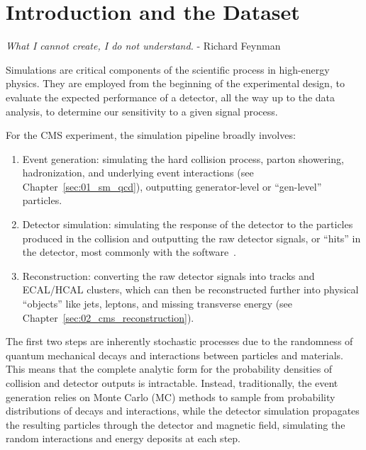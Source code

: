 
\chapter{Introduction and the \jetnet Dataset}
\label{sec:04_intro}

\begin{center}
    \parbox{.8\linewidth}{%
        \centering
        \noindent
        \textit{What I cannot create, I do not understand.}
        - Richard Feynman
    }
\end{center}

Simulations are critical components of the scientific process in high-energy physics.
They are employed from the beginning of the experimental design, to evaluate the expected performance of a detector, all the way up to the data analysis, to determine our sensitivity to a given signal process.

For the CMS experiment, the simulation pipeline broadly involves:
\begin{enumerate}
    \item Event generation: simulating the hard collision process, parton showering, hadronization, and underlying event interactions (see Chapter~\ref{sec:01_sm_qcd}), outputting generator-level or ``gen-level'' particles.
    \item Detector simulation: simulating the response of the detector to the particles produced in the collision and outputting the raw detector signals, or ``hits'' in the detector, most commonly with the \GEANTfour software~\cite{Agostinelli:2002hh}.
    \item Reconstruction: converting the raw detector signals into tracks and ECAL/HCAL clusters, which can then be reconstructed further into physical ``objects'' like jets, leptons, and missing transverse energy (see Chapter~\ref{sec:02_cms_reconstruction}).
\end{enumerate}

The first two steps are inherently stochastic processes due to the randomness of quantum mechanical decays and interactions between particles and materials.
This means that the complete analytic form for the probability densities of collision and detector outputs is intractable.
Instead, traditionally, the event generation relies on Monte Carlo (MC) methods to sample from probability distributions of decays and interactions, while the detector simulation propagates the resulting particles through the detector and magnetic field, simulating the random interactions and energy deposits at each step.

